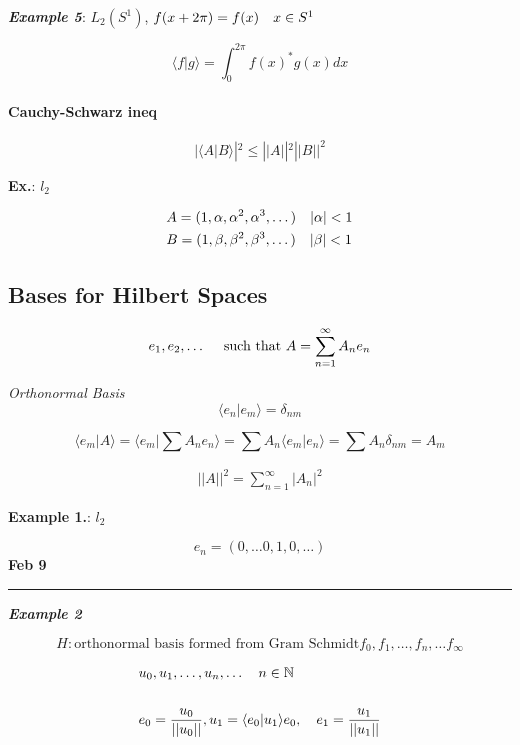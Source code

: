 \documentclass[svgnames]{article}   	%
\begin{document}
\textit{ \textbf{Example 5}}: $L_2(S^1)$, $f(x+2\pi) = f(x) \hspace{10px} x \in
S^1$

\[
  \langle f | g \rangle = \int_0^{2\pi} f(x)^\ast g(x) dx 
\] \vspace{20px}

\paragraph{Cauchy-Schwarz ineq} 

\[
 | \langle A | B \rangle |^2 \leq ||A||^2 ||B||^2
\]

\textbf{Ex.}: $l_2$

\begin{align*}
  &A = (1, \alpha, \alpha^2, \alpha^3, \dots)  \hspace{10px} |\alpha| < 1 \\
  &B = (1, \beta, \beta^2, \beta^3, \dots)  \hspace{10px} |\beta| < 1 
\end{align*}


\subsection{Bases for Hilbert Spaces}

\[
  e_1, e_2, \dots \hspace{10px} \text{ such that } A = \sum_{n=1}^{\infty} A_n
  e_n 
\] \vspace{5px}

\textit{Orthonormal Basis} 
\[
  \langle e_n | e_m \rangle = \delta_{nm}
\]

\[
\langle e_m | A \rangle = \langle e_m | \sum A_n e_n \rangle = \sum A_n \langle
e_m | e_n \rangle = \sum A_n \delta_{nm} = A_m
\]

\begin{align*}
  ||A||^2 = \sum_{n=1}^{\infty} |A_n|^2
\end{align*}

\textbf{Example 1.}: $l_2$ 

\[
e_n = (0, \dots 0, 1, 0, \dots) 
\]
\newpage
\noindent \textbf{Feb 9} \hrule
\vspace{10px}
\textit{ \textbf{Example 2}}
 
\[
  H: \text{orthonormal basis formed from Gram Schmidt} f_0, f_1, \dots, f_n,
  \dots f_{\infty} 
\]

\begin{tcolorbox}[colback = blue!5!white, colframe = blue!50!black, title
  = Gram Schmidt]
  
  \begin{align*}
    &u_0, u_1, \dots, u_n, \dots \hspace{10px} n \in \mathbb{N} \\\\
    &e_0 = \frac{u_0}{||u_0||}, u_1 = \langle e_0 | u_1 \rangle e_0,
    \hspace{10px} e_1 = \frac{u_1}{||u_1||}
  \end{align*}

\end{tcolorbox}
\end{document}
